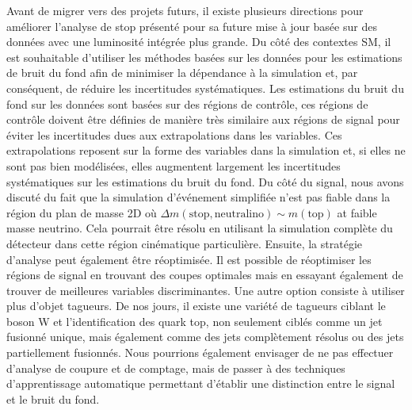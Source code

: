 Avant de migrer vers des projets futurs, il existe plusieurs directions pour améliorer l'analyse de stop présenté pour sa future mise à jour basée sur des données avec une luminosité intégrée plus grande. Du côté des contextes SM, il est souhaitable d'utiliser les méthodes basées sur les données pour les estimations de bruit du fond afin de minimiser la dépendance à la simulation et, par conséquent, de réduire les incertitudes systématiques. Les estimations du bruit du fond sur les données sont basées sur des régions de contrôle, ces régions de contrôle doivent être définies de manière très similaire aux régions de signal pour éviter les incertitudes dues aux extrapolations dans les variables. Ces extrapolations reposent sur la forme des variables dans la simulation et, si elles ne sont pas bien modélisées, elles augmentent largement les incertitudes systématiques sur les estimations du bruit du fond. Du côté du signal, nous avons discuté du fait que la simulation d'événement simplifiée n'est pas fiable dans la région du plan de masse 2D où $ \Delta m (\mathrm{stop, neutralino}) \sim m(\mathrm{top}) $ at faible masse neutrino. Cela pourrait être résolu en utilisant la simulation complète du détecteur dans cette région cinématique particulière. Ensuite, la stratégie d'analyse peut également être réoptimisée. Il est possible de réoptimiser les régions de signal en trouvant des coupes optimales mais en essayant également de trouver de meilleures variables discriminantes. Une autre option consiste à utiliser plus  d'objet tagueurs. De nos jours, il existe une variété de tagueurs ciblant le boson W et l’identification des quark top, non seulement ciblés comme un jet fusionné unique, mais également comme des jets complètement résolus ou des jets partiellement fusionnés. Nous pourrions également envisager de ne pas effectuer d’analyse de coupure et de comptage, mais de passer à des techniques d’apprentissage automatique permettant d’établir une distinction entre le signal et le bruit du fond.


